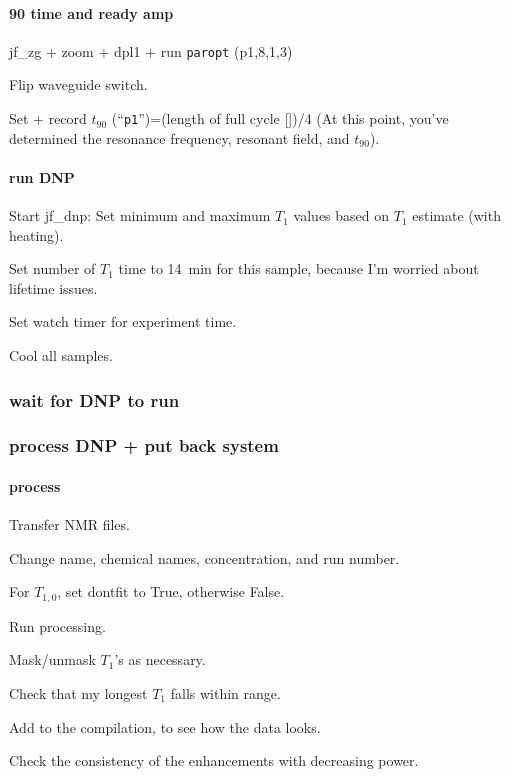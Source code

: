 \paragraph{90 time and ready amp}
jf\_zg + zoom + dpl1 + run {\tt paropt} (p1,8,1,3)

Flip waveguide switch.

Set + record $t_{90}$ (``\texttt{p1}'')=(length of full cycle [\us])/4 (At this point, you've determined the resonance frequency, resonant field, and $t_{90}$).

\paragraph{run DNP}
Start jf\_dnp: Set minimum and maximum $T_1$ values based on $T_1$ estimate (with heating).

Set number of $T_1$ time to 14~min for this sample, because I'm worried about lifetime issues.

Set watch timer for experiment time.

Cool all samples.

\subsubsection{wait for DNP to run}
\subsubsection{process DNP + put back system}
\paragraph{process}
Transfer NMR files.

Change name, chemical names, concentration, and run number.

For $T_{1,0}$, set dontfit to True, otherwise False.

Run processing.

Mask/unmask $T_1$'s as necessary.

Check that my longest $T_1$ falls within range.

Add to the compilation, to see how the data looks.

Check the consistency of the enhancements with decreasing power.

